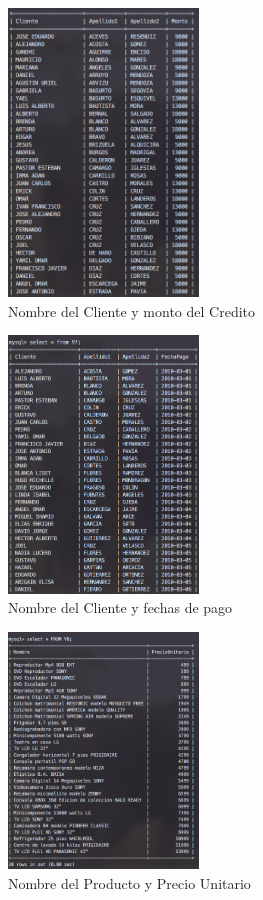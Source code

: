 \documentclass[12pt, fleqn]{article}                             %
\begin{document}
        \begin{figure}[ht!]
            \centering
            \includegraphics[width=0.45\textwidth]{BD5Reporte6}
            \caption{Nombre del Cliente y monto del Credito}
        \end{figure}

        \begin{figure}[ht!]
            \centering
            \includegraphics[width=0.45\textwidth]{BD5Reporte7}
            \caption{Nombre del Cliente y fechas de pago}
        \end{figure}


        \begin{figure}[ht!]
            \centering
            \includegraphics[width=0.45\textwidth]{BD5Reporte8}
            \caption{Nombre del Producto y Precio Unitario}
        \end{figure}
\end{document}
